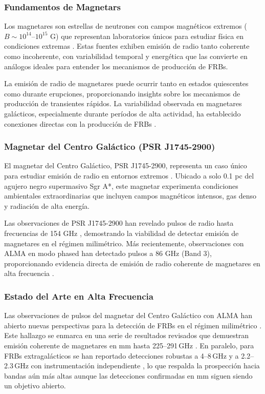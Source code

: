 \subsubsection{Fundamentos de Magnetars}

Los magnetares son estrellas de neutrones con campos magnéticos extremos ($B \sim 10^{14}$--$10^{15}$ G) que representan laboratorios únicos para estudiar física en condiciones extremas \citep{Bochenek2020}. Estas fuentes exhiben emisión de radio tanto coherente como incoherente, con variabilidad temporal y energética que las convierte en análogos ideales para entender los mecanismos de producción de FRBs.

La emisión de radio de magnetares puede ocurrir tanto en estados quiescentes como durante erupciones, proporcionando insights sobre los mecanismos de producción de transientes rápidos. La variabilidad observada en magnetares galácticos, especialmente durante períodos de alta actividad, ha establecido conexiones directas con la producción de FRBs \citep{CHIME_SGR2020}.

\subsubsection{Magnetar del Centro Galáctico (PSR J1745-2900)}

El magnetar del Centro Galáctico, PSR J1745-2900, representa un caso único para estudiar emisión de radio en entornos extremos \citep{Torne2015,Torne2017}. Ubicado a solo 0.1 pc del agujero negro supermasivo Sgr A*, este magnetar experimenta condiciones ambientales extraordinarias que incluyen campos magnéticos intensos, gas denso y radiación de alta energía.

Las observaciones de PSR J1745-2900 han revelado pulsos de radio hasta frecuencias de 154 GHz \citep{Torne2017}, demostrando la viabilidad de detectar emisión de magnetares en el régimen milimétrico. Más recientemente, observaciones con ALMA en modo phased han detectado pulsos a 86 GHz (Band 3), proporcionando evidencia directa de emisión de radio coherente de magnetares en alta frecuencia \citep{veracasanova2025}.

\subsubsection{Estado del Arte en Alta Frecuencia}

Las observaciones de pulsos del magnetar del Centro Galáctico con ALMA han abierto nuevas perspectivas para la detección de FRBs en el régimen milimétrico \citep{veracasanova2025}. Este hallazgo se enmarca en una serie de resultados revisados que demuestran emisión coherente de magnetares en mm hasta 225--291\,GHz \citep{Torne2015,Torne2017}. En paralelo, para FRBs extragalácticos se han reportado detecciones robustas a 4--8\,GHz \citep{Gajjar2018,Bethapudi2023} y a 2.2--2.3\,GHz con instrumentación independiente \citep{Majid2021}, lo que respalda la prospección hacia bandas aún más altas aunque las detecciones confirmadas en mm siguen siendo un objetivo abierto.

